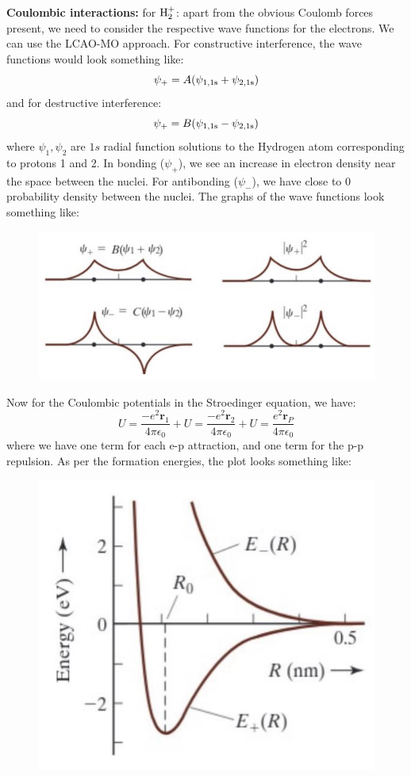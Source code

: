 \documentclass[11pt,fleqn]{book}
\begin{document}
\textbf{Coulombic interactions: }for $\rm H_2^+$: apart from the obvious Coulomb forces present, we need to consider the respective wave functions for the electrons. We can use the LCAO-MO approach. For constructive interference, the wave functions would look something like: 
\[\psi_+=A(\psi_{\rm 1,1s}+\psi_{\rm 2,1s})\]
and for destructive interference:
\[\psi_+=B(\psi_{\rm 1,1s}-\psi_{\rm 2,1s})\]
where $\psi_1,\psi_2$ are $1s$ radial function solutions to the Hydrogen atom corresponding to protons 1 and 2. In bonding ($\psi_+$), we see an increase in electron density near the space between the nuclei. For antibonding ($\psi_-$), we have close to 0 probability density between the nuclei. The graphs of the wave functions look something like:
\begin{figure}[h!]
	\begin{center}
		\includegraphics[width=0.6\linewidth]{Pictures/h2.png}
	\end{center}
	\caption{
	}
\end{figure}
Now for the Coulombic potentials in the Stroedinger equation, we have:
$$U=\frac{-e^2\textbf{r}_1}{4\pi\epsilon_0}+U=\frac{-e^2\textbf{r}_2}{4\pi\epsilon_0}+U=\frac{e^2\textbf{r}_P}{4\pi\epsilon_0}$$
where we have one term for each e-p attraction, and one term for the p-p repulsion. As per the formation energies, the plot looks something like:
\begin{figure}[h!]
	\begin{center}
		\includegraphics[width=0.6\linewidth]{Pictures/e.png}
	\end{center}
	\caption{
	}
\end{figure}
\end{document}
